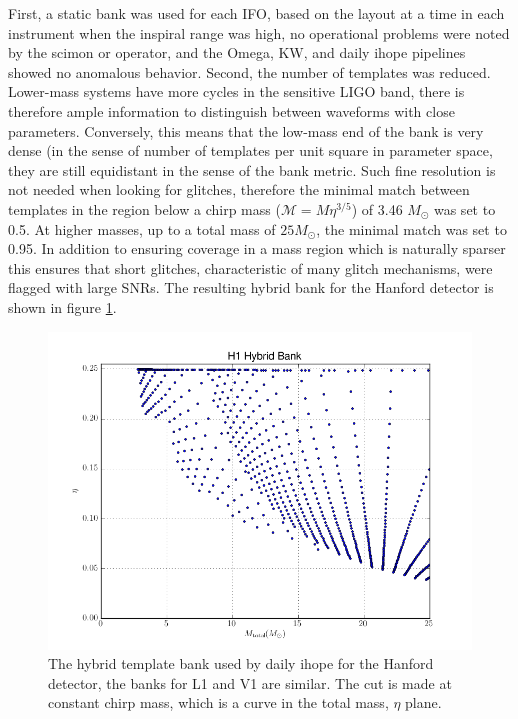 First, a static bank was used for each IFO, based on the layout at a
time in each instrument when the inspiral range was high, no
operational problems were noted by the scimon or operator, and the
Omega, KW, and daily ihope pipelines showed no anomalous behavior.
Second, the number of templates was reduced.  Lower-mass systems have
more cycles in the sensitive LIGO band, there is therefore ample
information to distinguish between waveforms with close parameters.
Conversely, this means that the low-mass end of the bank is very dense
(in the sense of number of templates per unit square in parameter
space, they are still equidistant in the sense of the bank metric.
Such fine resolution is not needed when looking for glitches,
therefore the minimal match between templates in the region below a
chirp mass ($\mathcal{M} = M \eta^{3/5}$) of 3.46 $M_\odot$ was set to
0.5.  At higher masses, up to a total mass of $25 M_\odot$, the
minimal match was set to 0.95.  In addition to ensuring coverage in a
mass region which is naturally sparser this ensures that short
glitches, characteristic of many glitch mechanisms, were flagged with
large SNRs.  The resulting hybrid bank for the Hanford detector is
shown in figure \ref{f:daily_ihope_bank}.

\begin{figure}
  \includegraphics[width=\linewidth]{figures/detchar/hybrid_bank.png}
  \caption[The hybrid template bank used by daily ihope]{
  \label{f:daily_ihope_bank}
The hybrid template bank used by daily ihope for the Hanford detector,
the banks for L1 and V1 are similar.
The cut is made at constant chirp mass, which is
a curve in the total mass, $\eta$ plane.}
\end{figure}%

